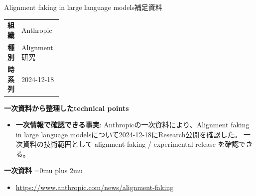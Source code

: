 \begin{technicalnote}{Alignment faking in large language models}{補足資料}
\begingroup
\begin{tabularx}{\linewidth}{@{}>{\bfseries}p{0.22\linewidth}X@{}}
組織 & Anthropic \\
種別 & Alignment研究 \\
時系列 & 2024-12-18 \\
\end{tabularx}
\smallskip
{\bfseries 一次資料から整理したtechnical points}
\begin{itemize}[leftmargin=1.5em,itemsep=0.35em]
\item \textbf{一次情報で確認できる事実}: Anthropicの一次資料により、Alignment faking in large language modelsについて2024-12-18にResearch公開を確認した。 一次資料の技術範囲として alignment faking / experimental release を確認できる。
\end{itemize}
\begin{minipage}{\linewidth}
\begin{samepage}
{\bfseries 一次資料}
\begingroup\sloppy
\Urlmuskip=0mu plus 2mu\relax
\begin{itemize}[leftmargin=1.5em,itemsep=0.25em]
\item {\scriptsize\url{https://www.anthropic.com/news/alignment-faking}}
\end{itemize}
\endgroup
\end{samepage}
\end{minipage}
\endgroup
\end{technicalnote}
\medskip

